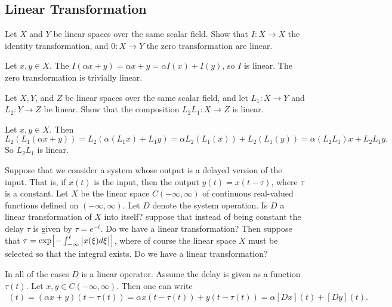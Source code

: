 \subsection{Linear Transformation}


\begin{problem}
	Let $ X $ and $ Y $ be linear spaces over the same scalar field. Show that $ I:X\to X $ the identity transformation, and $ 0:X\to Y $ the zero transformation are linear. 
\end{problem}
\begin{solution}
	Let $ x,y\in X $. The $ I(\alpha x+y) = \alpha x + y = \alpha I(x) + I(y) $, so $ I $ is linear. The zero transformation is trivially linear.
\end{solution}



\begin{problem}
	Let $ X,Y $, and $ Z $ be linear spaces over the same scalar field, and let $ L_1:X\to Y $ and $ L_2:Y\to Z $ be linear. Show that the composition $ L_2L_1:X\to Z $ is linear. 
\end{problem}
\begin{solution}
	Let $ x,y\in X $. Then 
	\[ L_2(L_1(\alpha x+y)) = L_2(\alpha(L_1x) + L_1y) = \alpha L_2(L_1(x)) + L_2(L_1(y)) = \alpha (L_2L_1)x + L_2L_1 y.  \]
	So $ L_2L_1 $ is linear.
\end{solution}


\begin{problem}
	Suppose that we consider a system whose output is a delayed version of the input. That is, if $ x(t) $ is the input, then the output $ y(t) = x(t-\tau) $, where $ \tau $ is a constant. Let $ X $ be the linear space $ C(-\infty,\infty) $ of continuous real-valued functions defined on $ (-\infty,\infty) $. Let $ D $ denote the system operation. Is $ D $ a linear transformation of $ X $ into itself? suppose that instead of being constant the delay $ \tau $ is given by $ \tau = e^{-t} $. Do we have a linear transformation? Then suppose that $ \tau = \exp[-\int_{-\infty}^{t}\left|x(\xi)d\xi\right|] $, where of course the linear space $ X $ must be selected so that the integral exists. Do we have a linear transformation?
\end{problem}

\begin{solution}
	In all of the cases $ D $ is a linear operator. Assume the delay is given as a function $ \tau(t) $. Let $ x,y\in C(-\infty,\infty) $. Then one can write
	\begin{align*}
		[D(\alpha x +y)](t) = (\alpha x + y)(t-\tau(t)) = \alpha x(t-\tau(t)) + y(t-\tau(t)) = \alpha [Dx](t) + [Dy](t).
	\end{align*}
\end{solution}



